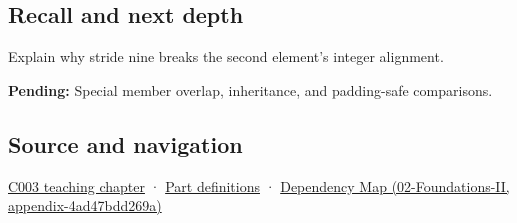 \subsection{Recall and next depth}\label{appendix-f52f8c5a3afd-recall-and-next-depth}

Explain why stride nine breaks the second element's integer alignment.

\textbf{Pending:} Special member overlap, inheritance, and padding-safe comparisons.

\subsection{Source and navigation}\label{appendix-f52f8c5a3afd-source-and-navigation}

\hyperref[01-foundations-i-ch002-where-the-bytes-live]{C003 teaching chapter} · \hyperref[appendix-fd090d982a15-m003---parts-41-60]{Part definitions} · \href{../02-Foundations-II/main.pdf\#nameddest=appendix-4ad47bdd269a}{Dependency Map (02-Foundations-II, appendix-4ad47bdd269a)}
